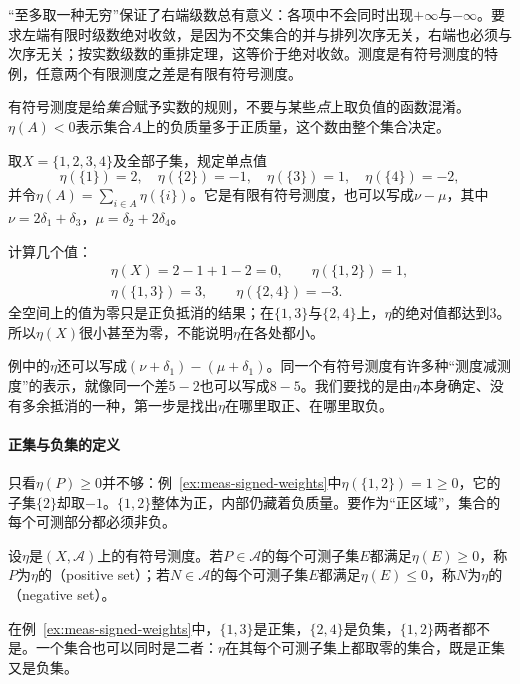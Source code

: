 “至多取一种无穷”保证了右端级数总有意义：各项中不会同时出现$+\infty$与$-\infty$。要求左端有限时级数绝对收敛，是因为不交集合的并与排列次序无关，右端也必须与次序无关；按实数级数的重排定理，这等价于绝对收敛。测度是有符号测度的特例，任意两个有限测度之差是有限有符号测度。

有符号测度是给\emph{集合}赋予实数的规则，不要与某些\emph{点}上取负值的函数混淆。$\eta(A)<0$表示集合$A$上的负质量多于正质量，这个数由整个集合决定。

\begin{example}[正负抵消]
\label{ex:meas-signed-weights}
取$X=\{1,2,3,4\}$及全部子集，规定单点值
\[
 \eta(\{1\})=2,\quad\eta(\{2\})=-1,\quad\eta(\{3\})=1,\quad\eta(\{4\})=-2,
\]
并令$\eta(A)=\sum_{i\in A}\eta(\{i\})$。它是有限有符号测度，也可以写成$\nu-\mu$，其中$\nu=2\delta_1+\delta_3$，$\mu=\delta_2+2\delta_4$。

计算几个值：
\[
\begin{gathered}
 \eta(X)=2-1+1-2=0,\qquad\eta(\{1,2\})=1,\\
 \eta(\{1,3\})=3,\qquad\eta(\{2,4\})=-3.
\end{gathered}
\]
全空间上的值为零只是正负抵消的结果；在$\{1,3\}$与$\{2,4\}$上，$\eta$的绝对值都达到$3$。所以$\eta(X)$很小甚至为零，不能说明$\eta$在各处都小。
\end{example}

例中的$\eta$还可以写成$(\nu+\delta_1)-(\mu+\delta_1)$。同一个有符号测度有许多种“测度减测度”的表示，就像同一个差$5-2$也可以写成$8-5$。我们要找的是由$\eta$本身确定、没有多余抵消的一种，第一步是找出$\eta$在哪里取正、在哪里取负。

\paragraph{正集与负集的定义}
只看$\eta(P)\geq0$并不够：例~\ref{ex:meas-signed-weights}中$\eta(\{1,2\})=1\geq0$，它的子集$\{2\}$却取$-1$。$\{1,2\}$整体为正，内部仍藏着负质量。要作为“正区域”，集合的每个可测部分都必须非负。

\begin{definition}[正集与负集]
\label{def:meas-positive-set}
设$\eta$是$(X,\mathcal A)$上的有符号测度。若$P\in\mathcal A$的每个可测子集$E$都满足$\eta(E)\geq0$，称$P$为$\eta$的（positive set）；若$N\in\mathcal A$的每个可测子集$E$都满足$\eta(E)\leq0$，称$N$为$\eta$的（negative set）。
\end{definition}

在例~\ref{ex:meas-signed-weights}中，$\{1,3\}$是正集，$\{2,4\}$是负集，$\{1,2\}$两者都不是。一个集合也可以同时是二者：$\eta$在其每个可测子集上都取零的集合，既是正集又是负集。

